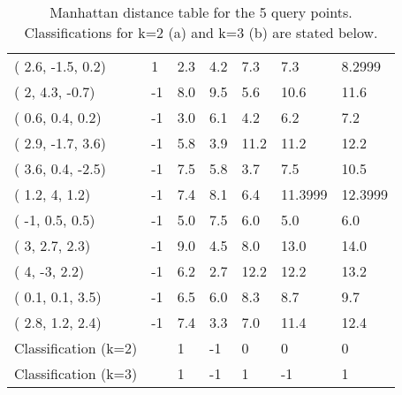 \documentclass[12pt]{article}
\begin{document}
\begin{table}[h!]
\begin{tabular}{lllllll}
( 2.6, -1.5, 0.2)    & 1     & \cellcolor[HTML]{FFFE65}2.3 & 4.2                         & 7.3                         & 7.3                         & 8.2999                         \\
( 2, 4.3, -0.7)      & -1    & 8.0                         & 9.5                         & 5.6                         & 10.6                        & 11.6                           \\
( 0.6, 0.4, 0.2)     & -1    & 3.0                         & 6.1                         & 4.2                         & 6.2                         & 7.2                            \\
( 2.9, -1.7, 3.6)    & -1    & 5.8                         & \cellcolor[HTML]{FFCC67}3.9 & 11.2                        & 11.2                        & 12.2                           \\
( 3.6, 0.4, -2.5)    & -1    & 7.5                         & 5.8                         & \cellcolor[HTML]{FFFE65}3.7 & 7.5                         & 10.5                           \\
( 1.2, 4, 1.2)       & -1    & 7.4                         & 8.1                         & 6.4                         & 11.3999                     & 12.3999                        \\
( -1, 0.5, 0.5)      & -1    & 5.0                         & 7.5                         & 6.0                         & 5.0                         & 6.0                            \\
( 3, 2.7, 2.3)       & -1    & 9.0                         & 4.5                         & 8.0                         & 13.0                        & 14.0                           \\
( 4, -3, 2.2)        & -1    & 6.2                         & \cellcolor[HTML]{FFFE65}2.7 & 12.2                        & 12.2                        & 13.2                           \\
( 0.1, 0.1, 3.5)     & -1    & 6.5                         & 6.0                         & 8.3                         & 8.7                         & 9.7                            \\
( 2.8, 1.2, 2.4)     & -1    & 7.4                         & \cellcolor[HTML]{FFFE65}3.3 & 7.0                         & 11.4                        & 12.4                           \\ \hline
Classification (k=2) &       & 1                           & -1                          & 0                           & 0                           & 0                              \\
Classification (k=3) &       & 1                           & -1                          & 1                           & -1                           & 1                             \\ \hline
\end{tabular}
\caption{Manhattan distance table for the 5 query points. Classifications for k=2 (a) and k=3 (b) are stated below.}
\end{table}
\end{document}

